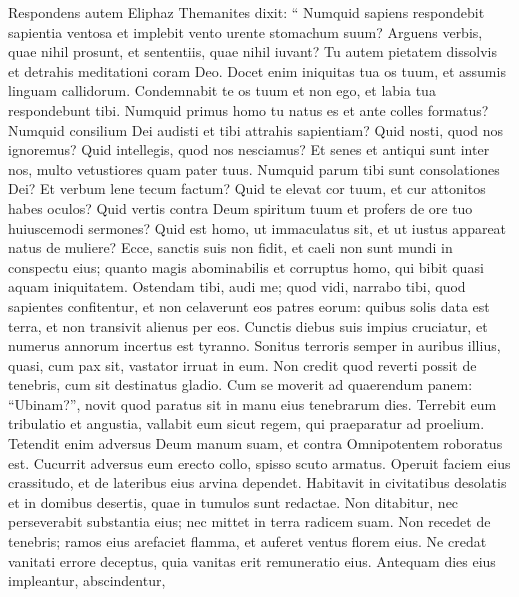 \begin{biblechapter}
\begin{biblechapter}
\begin{biblechapter}
\begin{biblechapter}
\begin{biblechapter}
\begin{biblechapter}
\begin{biblechapter}
\begin{biblechapter}
\begin{biblechapter}
\begin{biblechapter}
\begin{biblechapter}
\begin{biblechapter}
\begin{biblechapter}
\begin{biblechapter}
\begin{biblechapter}
\verse Respondens autem Eliphaz Themanites dixit:
 \verse “ Numquid sapiens respondebit sapientia ventosa
 et implebit vento urente stomachum suum?
 \verse Arguens verbis, quae nihil prosunt,
 et sententiis, quae nihil iuvant?
 \verse Tu autem pietatem dissolvis
 et detrahis meditationi coram Deo. 
\verse Docet enim iniquitas tua os tuum,
 et assumis linguam callidorum.
 \verse Condemnabit te os tuum et non ego,
 et labia tua respondebunt tibi.
 \verse Numquid primus homo tu natus es
 et ante colles formatus?
 \verse Numquid consilium Dei audisti
 et tibi attrahis sapientiam?
 \verse Quid nosti, quod nos ignoremus?
 Quid intellegis, quod nos nesciamus?
 \verse Et senes et antiqui sunt inter nos,
 multo vetustiores quam pater tuus. 
\verse Numquid parum tibi sunt consolationes Dei?
 Et verbum lene tecum factum?
 \verse Quid te elevat cor tuum,
 et cur attonitos habes oculos?
 \verse Quid vertis contra Deum spiritum tuum
 et profers de ore tuo huiuscemodi sermones?
 \verse Quid est homo, ut immaculatus sit,
 et ut iustus appareat natus de muliere?
 \verse Ecce, sanctis suis non fidit,
 et caeli non sunt mundi in conspectu eius;
 \verse quanto magis abominabilis et corruptus homo,
 qui bibit quasi aquam iniquitatem. 
\verse Ostendam tibi, audi me;
 quod vidi, narrabo tibi,
 \verse quod sapientes confitentur,
 et non celaverunt eos patres eorum: 
\verse quibus solis data est terra,
 et non transivit alienus per eos.
 \verse Cunctis diebus suis impius cruciatur,
 et numerus annorum incertus est tyranno.
 \verse Sonitus terroris semper in auribus illius,
 quasi, cum pax sit, vastator irruat in eum.
 \verse Non credit quod reverti possit de tenebris,
 cum sit destinatus gladio.
 \verse Cum se moverit ad quaerendum panem: “Ubinam?”,
 novit quod paratus sit in manu eius tenebrarum dies.
 \verse Terrebit eum tribulatio et angustia,
 vallabit eum sicut regem, qui praeparatur ad proelium.
 \verse Tetendit enim adversus Deum manum suam,
 et contra Omnipotentem roboratus est.
 \verse Cucurrit adversus eum erecto collo,
 spisso scuto armatus.
 \verse Operuit faciem eius crassitudo,
 et de lateribus eius arvina dependet.
 \verse Habitavit in civitatibus desolatis
 et in domibus desertis, quae in tumulos sunt redactae.
 \verse Non ditabitur, nec perseverabit substantia eius;
 nec mittet in terra radicem suam.
 \verse Non recedet de tenebris;
 ramos eius arefaciet flamma,
 et auferet ventus florem eius.
 \verse Ne credat vanitati errore deceptus,
 quia vanitas erit remuneratio eius.
 \verse Antequam dies eius impleantur, abscindentur,

\end{biblechapter}
\end{biblechapter}
\end{biblechapter}
\end{biblechapter}
\end{biblechapter}
\end{biblechapter}
\end{biblechapter}
\end{biblechapter}
\end{biblechapter}
\end{biblechapter}
\end{biblechapter}
\end{biblechapter}
\end{biblechapter}
\end{biblechapter}
\end{biblechapter}
